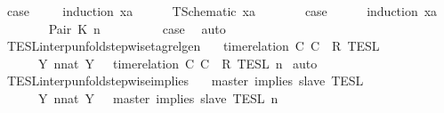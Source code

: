 \begin{isabellebody}
\ {\isacharquery}case\ \isanewline
\ \ \isamarkupfalse%
\ {\isacharparenleft}induction\ x{}a{\isacharparenright}\isanewline
\ \ \ \ \isamarkupfalse%
\ {\isacharparenleft}TSchematic\ xa{\isacharparenright}\isanewline
\ \ \ \ \isamarkupfalse%
\ \isamarkupfalse%
\ {\isacharquery}case\isanewline
\ \ \ \ \isamarkupfalse%
\ {\isacharparenleft}induction\ xa{\isacharparenright}\isanewline
\ \ \ \ \ \ \isamarkupfalse%
\ {\isacharparenleft}Pair\ K\ n{\isacharprime}{\isacharparenright}\isanewline
\ \ \ \ \ \ \isamarkupfalse%
\ \isamarkupfalse%
\ {\isacharquery}case\ \isamarkupfalse%
\ auto\isanewline
\ \ \ \ \isamarkupfalse%
\isanewline
\ \ \isamarkupfalse%
\isanewline
{}\isamarkupfalse%
%
\endisatagproof
{\isafoldproof}%
%
\isadelimproof
\isanewline
%
\endisadelimproof
\isanewline
{}\isamarkupfalse%
\ TESL{\isacharunderscore}interp{\isacharunderscore}unfold{\isacharunderscore}stepwise{\isacharunderscore}tagrelgen{\isacharcolon}\isanewline
\ \ {\isacartoucheopen}{\isasymlbrakk}\ time{\isacharminus}relation\ {\isasymlfloor}C\ C\ {\isasymin}\ R\ {\isasymrbrakk}\isactrlsub T\isactrlsub E\isactrlsub S\isactrlsub L\isanewline
\ \ \ \ {\isacharequal}\ {\isasymInter}\ {\isacharbraceleft}Y{\isachardot}\ {\isasymexists}n{\isacharcolon}{\isacharcolon}nat{\isachardot}\ Y\ {\isacharequal}\ {\isasymlbrakk}\ time{\isacharminus}relation\ {\isasymlfloor}C\ C\ {\isasymin}\ R\ {\isasymrbrakk}\isactrlsub T\isactrlsub E\isactrlsub S\isactrlsub L\isactrlbsup {\isasymge}\ n\isactrlesup {\isacharbraceright}{\isacartoucheclose}\isanewline
%
\isadelimproof
%
\endisadelimproof
%
\isatagproof
{}\isamarkupfalse%
\ auto%
\endisatagproof
{\isafoldproof}%
%
\isadelimproof
\isanewline
%
\endisadelimproof
\isanewline
{}\isamarkupfalse%
\ TESL{\isacharunderscore}interp{\isacharunderscore}unfold{\isacharunderscore}stepwise{\isacharunderscore}implies{\isacharcolon}\isanewline
\ \ {\isacartoucheopen}{\isasymlbrakk}\ master\ implies\ slave\ {\isasymrbrakk}\isactrlsub T\isactrlsub E\isactrlsub S\isactrlsub L\isanewline
\ \ \ \ {\isacharequal}\ {\isasymInter}\ {\isacharbraceleft}Y{\isachardot}\ {\isasymexists}n{\isacharcolon}{\isacharcolon}nat{\isachardot}\ Y\ {\isacharequal}\ {\isasymlbrakk}\ master\ implies\ slave\ {\isasymrbrakk}\isactrlsub T\isactrlsub E\isactrlsub S\isactrlsub L\isactrlbsup {\isasymge}\ n\isactrlesup {\isacharbraceright}{\isacartoucheclose}\isanewline

\end{isabellebody}
